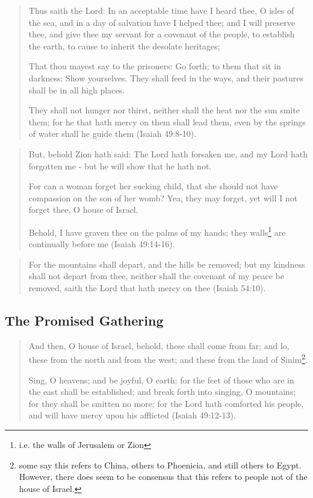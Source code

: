 \begin{quotation}
Thus saith the Lord: In an acceptable time have I heard thee, O isles of the sea, and in a day of salvation have I helped thee; and I will preserve thee, and give thee my servant for a covenant of the people, to establish the earth, to cause to inherit the desolate heritages;

That thou mayest say to the prisoners: Go forth; to them that sit in darkness: Show yourselves. They shall feed in the ways, and their pastures shall be in all high places.

They shall not hunger nor thirst, neither shall the heat nor the sun smite them; for he that hath mercy on them shall lead them, even by the springs of water shall he guide them (Isaiah 49:8-10).
\end{quotation}

\begin{quotation}
But, behold Zion hath said: The Lord hath forsaken me, and my Lord hath forgotten me - but he will show that he hath not.

For can a woman forget her sucking child, that she should not have compassion on the son of her womb? Yea, they may forget, yet will I not forget thee, O house of Israel.

Behold, I have graven thee on the palms of my hands; they walls\footnote{i.e. the walls of Jerusalem or Zion} are continually before me (Isaiah 49:14-16).
\end{quotation}

\begin{quotation}
For the mountains shall depart, and the hills be removed; but my kindness shall not depart from thee, neither shall the covenant of my peace be removed, saith the Lord that hath mercy on thee (Isaiah 54:10).
\end{quotation}

\subsection{The Promised Gathering}

\begin{quotation}
And then, O house of Israel, behold, these shall come from far; and lo, these from the north and from the west; and these from the land of Sinim\footnote{some say this refers to China, others to Phoenicia, and still others to Egypt. However, there does seem to be consensus that this refers to people not of the house of Israel.}.

Sing, O heavens; and be joyful, O earth; for the feet of those who are in the east shall be established; and break forth into singing, O mountains; for they shall be smitten no more; for the Lord hath comforted his people, and will have mercy upon his afflicted (Isaiah 49:12-13).
\end{quotation}

